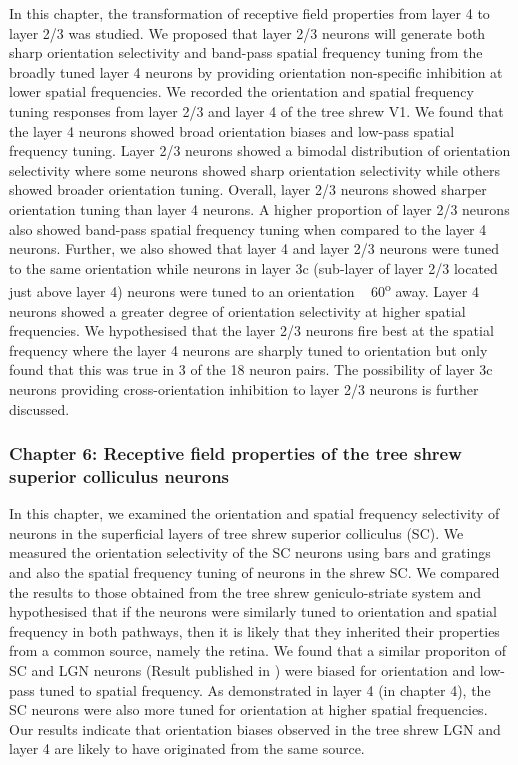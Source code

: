 In this chapter, the transformation of receptive field properties from
layer 4 to layer 2/3 was studied. We proposed that layer 2/3 neurons
will generate both sharp orientation selectivity and band-pass spatial
frequency tuning from the broadly tuned layer 4 neurons by providing
orientation non-specific inhibition at lower spatial frequencies. We
recorded the orientation and spatial frequency tuning responses from
layer 2/3 and layer 4 of the tree shrew V1. We found that the layer 4
neurons showed broad orientation biases and low-pass spatial frequency
tuning. Layer 2/3 neurons showed a bimodal distribution of orientation
selectivity where some neurons showed sharp orientation selectivity
while others showed broader orientation tuning. Overall, layer 2/3
neurons showed sharper orientation tuning than layer 4 neurons. A higher
proportion of layer 2/3 neurons also showed band-pass spatial frequency
tuning when compared to the layer 4 neurons. Further, we also showed
that layer 4 and layer 2/3 neurons were tuned to the same orientation
while neurons in layer 3c (sub-layer of layer 2/3 located just above
layer 4) neurons were tuned to an orientation ~ 60\textsuperscript{o}
away. Layer 4 neurons showed a greater degree of orientation selectivity
at higher spatial frequencies. We hypothesised that the layer 2/3
neurons fire best at the spatial frequency where the layer 4 neurons are
sharply tuned to orientation but only found that this was true in 3 of
the 18 neuron pairs. The possibility of layer 3c neurons providing
cross-orientation inhibition to layer 2/3 neurons is further discussed.

\subsubsection{Chapter 6: Receptive field properties of the tree shrew superior colliculus neurons}

In this chapter, we examined the orientation and spatial frequency
selectivity of neurons in the superficial layers of tree shrew superior
colliculus (SC). We measured the orientation selectivity of the SC
neurons using bars and gratings and also the spatial frequency tuning of
neurons in the shrew SC. We compared the results to those obtained from
the tree shrew geniculo-striate system and hypothesised that if the
neurons were similarly tuned to orientation and spatial frequency in
both pathways, then it is likely that they inherited their properties
from a common source, namely the retina. We found that a similar
proporiton of SC and LGN neurons (Result published in \cite{VanHooser2013e}) were biased for orientation and low-pass tuned to spatial
frequency. As demonstrated in layer 4 (in chapter 4), the SC neurons
were also more tuned for orientation at higher spatial frequencies. Our
results indicate that orientation biases observed in the tree shrew LGN
and layer 4 are likely to have originated from the same source.


